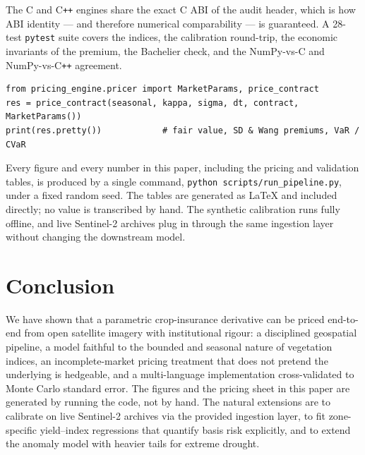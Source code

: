 \documentclass[11pt]{article}
\begin{document}
The C and C\texttt{++} engines share the exact C ABI of the audit header, which is
how ABI identity --- and therefore numerical comparability --- is guaranteed. A
28-test \texttt{pytest} suite covers the indices, the calibration round-trip, the
economic invariants of the premium, the Bachelier check, and the NumPy-vs-C and
NumPy-vs-C\texttt{++} agreement.

\begin{lstlisting}[caption={Pricing one contract through the reference engine.},captionpos=b]
from pricing_engine.pricer import MarketParams, price_contract
res = price_contract(seasonal, kappa, sigma, dt, contract, MarketParams())
print(res.pretty())            # fair value, SD & Wang premiums, VaR / CVaR
\end{lstlisting}

\begin{keybox}[title=Reproducibility]
Every figure and every number in this paper, including the pricing and validation
tables, is produced by a single command, \texttt{python scripts/run\_pipeline.py},
under a fixed random seed. The tables are generated as \LaTeX{} and included
directly; no value is transcribed by hand. The synthetic calibration runs fully
offline, and live Sentinel-2 archives plug in through the same ingestion layer
without changing the downstream model.
\end{keybox}

\section{Conclusion}
We have shown that a parametric crop-insurance derivative can be priced
end-to-end from open satellite imagery with institutional rigour: a disciplined
geospatial pipeline, a model faithful to the bounded and seasonal nature of
vegetation indices, an incomplete-market pricing treatment that does not pretend
the underlying is hedgeable, and a multi-language implementation cross-validated
to Monte Carlo standard error. The figures and the pricing sheet in this paper are
generated by running the code, not by hand. The natural extensions are to
calibrate on live Sentinel-2 archives via the provided ingestion layer, to fit
zone-specific yield--index regressions that quantify basis risk explicitly, and to
extend the anomaly model with heavier tails for extreme drought.

\end{document}
